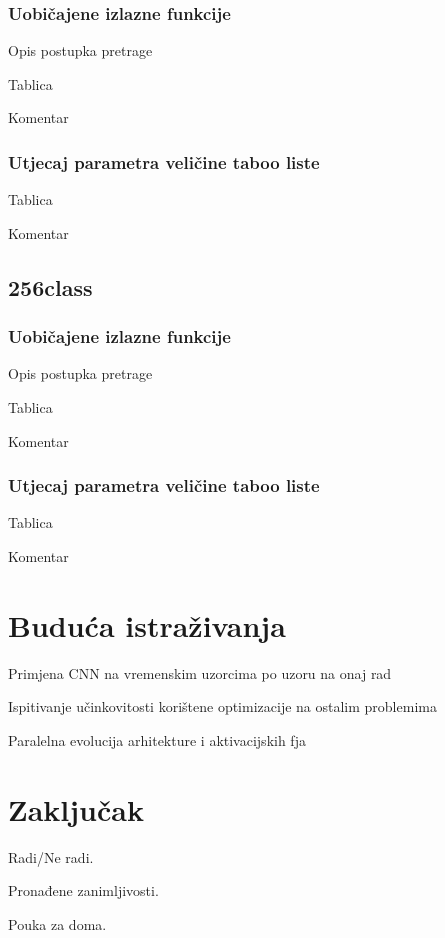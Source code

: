 \documentclass[times, utf8, diplomski]{fer}
\begin{document}
\subsection{Uobičajene izlazne funkcije}
Opis postupka pretrage

Tablica

Komentar

\subsection{Utjecaj parametra veličine taboo liste}
Tablica

Komentar

\section{256class}

\subsection{Uobičajene izlazne funkcije}
Opis postupka pretrage

Tablica

Komentar

\subsection{Utjecaj parametra veličine taboo liste}
Tablica

Komentar

\chapter{Buduća istraživanja}
Primjena CNN na vremenskim uzorcima po uzoru na onaj rad

Ispitivanje učinkovitosti korištene optimizacije na ostalim problemima

Paralelna evolucija arhitekture i aktivacijskih fja

\chapter{Zaključak}
Radi/Ne radi. 

Pronađene zanimljivosti. 

Pouka za doma.



\end{document}
